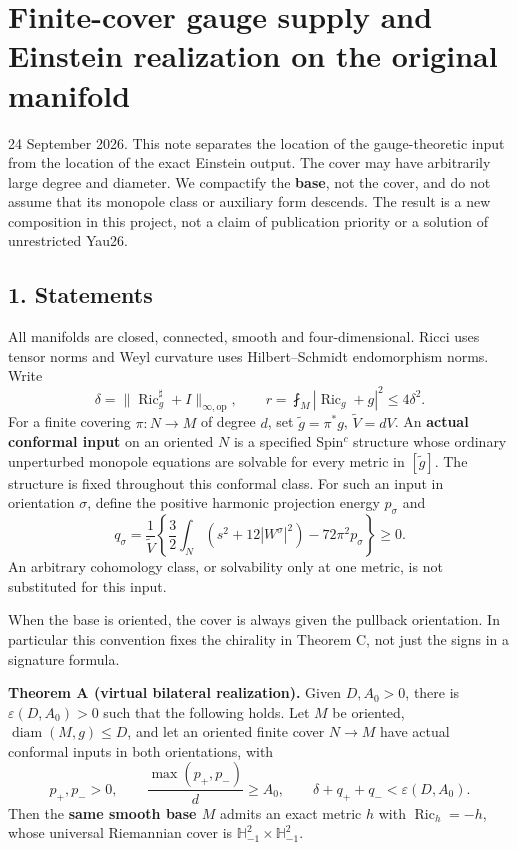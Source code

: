 \documentclass[
  11pt,
]{article}
\author{}
\date{}
\begin{document}
\hypertarget{finite-cover-gauge-supply-and-einstein-realization-on-the-original-manifold}{%
\section{Finite-cover gauge supply and Einstein realization on the
original
manifold}\label{finite-cover-gauge-supply-and-einstein-realization-on-the-original-manifold}}

24 September 2026. This note separates the location of the
gauge-theoretic input from the location of the exact Einstein output.
The cover may have arbitrarily large degree and diameter. We compactify
the \textbf{base}, not the cover, and do not assume that its monopole
class or auxiliary form descends. The result is a new composition in
this project, not a claim of publication priority or a solution of
unrestricted Yau26.

\hypertarget{statements}{%
\subsection{1. Statements}\label{statements}}

All manifolds are closed, connected, smooth and four-dimensional. Ricci
uses tensor norms and Weyl curvature uses Hilbert--Schmidt endomorphism
norms. Write \[
 \delta=\|\operatorname{Ric}_g^\sharp+I\|_{\infty,\mathrm{op}},
 \qquad r=\fint_M|\operatorname{Ric}_g+g|^2\le4\delta^2.
 \tag{1}
\] For a finite covering \(\pi:N\to M\) of degree \(d\), set
\(\widetilde g=\pi^*g\), \(\widetilde V=dV\). An \textbf{actual
conformal input} on an oriented \(N\) is a specified Spin\(^c\)
structure whose ordinary unperturbed monopole equations are solvable for
every metric in \([\widetilde g]\). The structure is fixed throughout
this conformal class. For such an input in orientation \(\sigma\),
define the positive harmonic projection energy \(p_\sigma\) and \[
 q_\sigma=\frac{1}{\widetilde V}
 \left\{\frac32\int_N(s^2+12|W^\sigma|^2)
                       -72\pi^2p_\sigma\right\}\ge0.
 \tag{2}
\] An arbitrary cohomology class, or solvability only at one metric, is
not substituted for this input.

When the base is oriented, the cover is always given the pullback
orientation. In particular this convention fixes the chirality in
Theorem C, not just the signs in a signature formula.

\textbf{Theorem A (virtual bilateral realization).} Given \(D,A_0>0\),
there is \(\varepsilon(D,A_0)>0\) such that the following holds. Let
\(M\) be oriented, \(\operatorname{diam}(M,g)\le D\), and let an
oriented finite cover \(N\to M\) have actual conformal inputs in both
orientations, with \[
 p_+,p_->0,\qquad \frac{\max(p_+,p_-)}d\ge A_0,
 \qquad \delta+q_++q_-<\varepsilon(D,A_0).
 \tag{3}
\] Then the \textbf{same smooth base \(M\)} admits an exact metric \(h\)
with \(\operatorname{Ric}_h=-h\), whose universal Riemannian cover is
\(\mathbb H^2_{-1}\times\mathbb H^2_{-1}\).
\end{document}
